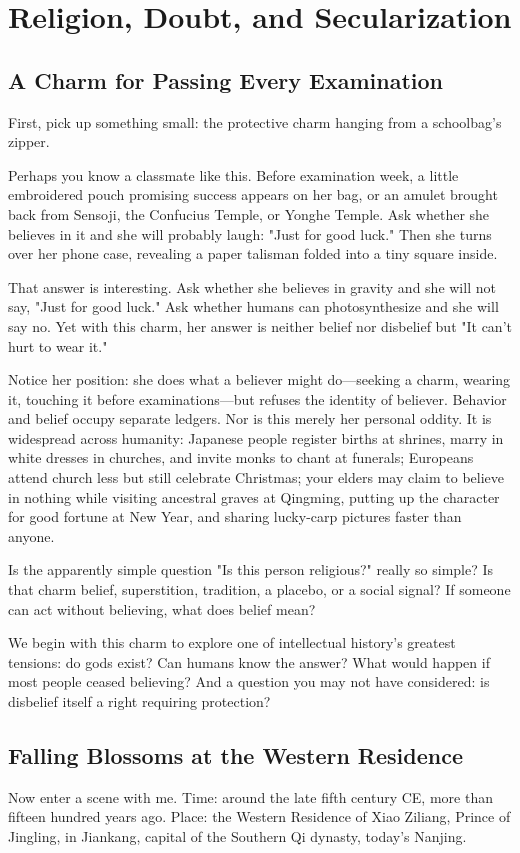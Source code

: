 \chapter{Religion, Doubt, and Secularization}
\section{A Charm for Passing Every Examination}
First, pick up something small: the protective charm hanging from a schoolbag's zipper.

Perhaps you know a classmate like this. Before examination week, a little embroidered pouch promising success appears on her bag, or an amulet brought back from Sensoji, the Confucius Temple, or Yonghe Temple. Ask whether she believes in it and she will probably laugh: "Just for good luck." Then she turns over her phone case, revealing a paper talisman folded into a tiny square inside.

That answer is interesting. Ask whether she believes in gravity and she will not say, "Just for good luck." Ask whether humans can photosynthesize and she will say no. Yet with this charm, her answer is neither belief nor disbelief but "It can't hurt to wear it."

Notice her position: she does what a believer might do---seeking a charm, wearing it, touching it before examinations---but refuses the identity of believer. Behavior and belief occupy separate ledgers. Nor is this merely her personal oddity. It is widespread across humanity: Japanese people register births at shrines, marry in white dresses in churches, and invite monks to chant at funerals; Europeans attend church less but still celebrate Christmas; your elders may claim to believe in nothing while visiting ancestral graves at Qingming, putting up the character for good fortune at New Year, and sharing lucky-carp pictures faster than anyone.

Is the apparently simple question "Is this person religious?" really so simple? Is that charm belief, superstition, tradition, a placebo, or a social signal? If someone can act without believing, what does belief mean?

We begin with this charm to explore one of intellectual history's greatest tensions: do gods exist? Can humans know the answer? What would happen if most people ceased believing? And a question you may not have considered: is disbelief itself a right requiring protection?

\section{Falling Blossoms at the Western Residence}
Now enter a scene with me. Time: around the late fifth century CE, more than fifteen hundred years ago. Place: the Western Residence of Xiao Ziliang, Prince of Jingling, in Jiankang, capital of the Southern Qi dynasty, today's Nanjing.

